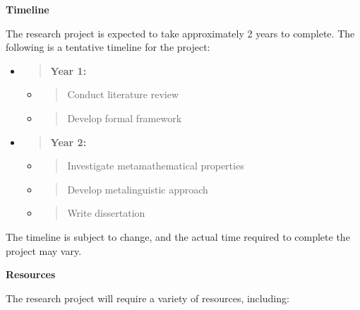 \textbf{Timeline}

The research project is expected to take approximately 2 years to
complete. The following is a tentative timeline for the project:

\begin{itemize}
\item
  \begin{quote}
  \textbf{Year 1:\\
  }
  \end{quote}

  \begin{itemize}
  \item
    \begin{quote}
    Conduct literature review
    \end{quote}
  \item
    \begin{quote}
    Develop formal framework
    \end{quote}
  \end{itemize}
\item
  \begin{quote}
  \textbf{Year 2:\\
  }
  \end{quote}

  \begin{itemize}
  \item
    \begin{quote}
    Investigate metamathematical properties
    \end{quote}
  \item
    \begin{quote}
    Develop metalinguistic approach
    \end{quote}
  \item
    \begin{quote}
    Write dissertation
    \end{quote}
  \end{itemize}
\end{itemize}

The timeline is subject to change, and the actual time required to
complete the project may vary.

\textbf{Resources}

The research project will require a variety of resources, including:

